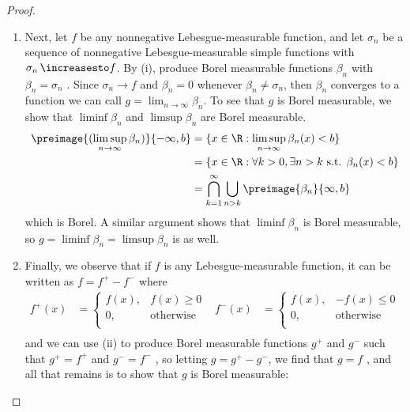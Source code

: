 \documentclass[12pt,letterpaper]{article}
\begin{document}
\begin{enumerate}
\begin{proof}
\begin{enumerate}[label=(\roman*)]
	\item Next, let $f$ be any nonnegative Lebesgue-measurable function, and let $\sigma_n$ be a sequence of nonnegative Lebesgue-measurable simple functions with $\sigma_n\,\increasesto f$. By (i), produce Borel measurable functions $\beta_n$ with $\beta_n=\sigma_n$ \muae{}. Since $\sigma_n\to f$ and $\beta_n=0$ whenever $\beta_n\neq\sigma_n$, then $\beta_n$ converges to a function we can call $g=\lim_{n\to\infty} \beta_n$. To see that $g$ is Borel measurable, we show that $\liminf \beta_n$ and $\limsup \beta_n$ are Borel measurable.
	\begin{align*}
	\preimage{(\limsup_{n\to\infty} \beta_n)}{-\infty,b} &= \{x\in\R: \limsup_{n\to\infty} \beta_n(x)<b\}\\
	&= \{x\in\R: \forall k>0, \exists n>k \text{ s.t. } \beta_n(x)<b\}\\
	&= \bigcap_{k=1}^\infty\bigcup_{n>k}\preimage{\beta_n}{\infty,b}
	\end{align*}
which is Borel. A similar argument shows that $\liminf \beta_n$ is Borel measurable, so $g=\liminf \beta_n=\limsup \beta_n$ is as well. 
	
	\item Finally, we observe that if $f$ is any Lebesgue-measurable function, it can be written as $f=f^+-f^-$ where 
	\begin{align*}
	f^+(x)&=\begin{cases}
	f(x), & f(x)\geq0\\
	0, & \text{otherwise}\\
	\end{cases} &
	f^-(x)&=\begin{cases}
	f(x), & -f(x)\leq0\\
	0, & \text{otherwise}\\
	\end{cases} \\
	\end{align*}
	and we can use (ii) to produce Borel measurable functions $g^+$ and $g^-$ such that $g^+=f^+$ \muae{} and $g^-=f^-$ \muae{}, so letting $g=g^+-g^-$, we find that $g=f$ \muae{}, and all that remains is to show that $g$ is Borel measurable: 
	

\end{enumerate}
\end{proof}
\end{enumerate}
\end{document}
